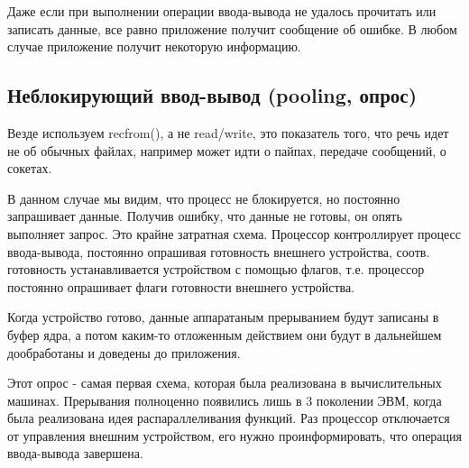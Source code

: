 \documentclass[12pt,a4paper]{scrreprt}
\begin{document}
Даже если при выполнении операции ввода-вывода не удалось прочитать или записать данные, все равно приложение получит сообщение об ошибке. В любом случае приложение получит некоторую информацию.

\subsection*{Неблокирующий ввод-вывод (pooling, опрос)}

Везде используем recfrom(), а не read/write, это показатель того, что речь идет не об обычных файлах, например может идти о пайпах, передаче сообщений, о сокетах.

\begin{figure}[!h]
\end{figure}

В данном случае мы видим, что процесс не блокируется, но постоянно запрашивает данные. Получив ошибку, что данные не готовы, он опять выполняет запрос. Это крайне затратная схема. Процессор контроллирует процесс ввода-вывода, постоянно опрашивая готовность внешнего устройства, соотв. готовность устанавливается устройством с помощью флагов, т.е. процессор постоянно опрашивает флаги готовности внешнего устройства. 

Когда устройство готово, данные аппаратаным прерыванием будут записаны в буфер ядра, а потом каким-то отложенным действием они будут в дальнейшем дообработаны и доведены до приложения. 

Этот опрос - самая первая схема, которая была реализована в вычислительных машинах. Прерывания полноценно появились лишь в 3 поколении ЭВМ, когда была реализована идея распараллеливания функций. Раз процессор отключается от управления внешним устройством, его нужно проинформировать, что операция ввода-вывода завершена.
\end{document}
